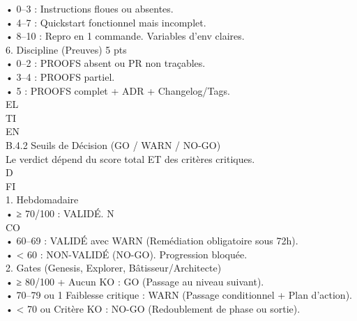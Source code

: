 • 0–3 : Instructions floues ou absentes.\\
• 4–7 : Quickstart fonctionnel mais incomplet.\\
• 8–10 : Repro en 1 commande. Variables d’env claires.\\
\vspace{0.5em}
6. Discipline (Preuves)           5 pts\\
• 0–2 : PROOFS absent ou PR non traçables.\\
• 3–4 : PROOFS partiel.\\
• 5 : PROOFS complet + ADR + Changelog/Tags.\\
\vspace{0.5em}
\vspace{0.5em}
\vspace{0.5em}
\vspace{0.5em}
EL\\
TI\\
EN\\
B.4.2 Seuils de Décision (GO / WARN / NO-GO)\\
Le verdict dépend du score total ET des critères critiques.\\
\vspace{0.5em}
\vspace{0.5em}
\vspace{0.5em}
\vspace{0.5em}
D\\
FI\\
1. Hebdomadaire\\
\vspace{0.5em}
• ≥ 70/100 : VALIDÉ.                           N\\
CO\\
• 60–69 : VALIDÉ avec WARN (Remédiation obligatoire sous 72h).\\
\vspace{0.5em}
• \textless{} 60 : NON-VALIDÉ (NO-GO). Progression bloquée.\\
\vspace{0.5em}
2. Gates (Genesis, Explorer, Bâtisseur/Architecte)\\
\vspace{0.5em}
• ≥ 80/100 + Aucun KO : GO (Passage au niveau suivant).\\
\vspace{0.5em}
• 70–79 ou 1 Faiblesse critique : WARN (Passage conditionnel + Plan d’action).\\
\vspace{0.5em}
• \textless{} 70 ou Critère KO : NO-GO (Redoublement de phase ou sortie).\\
